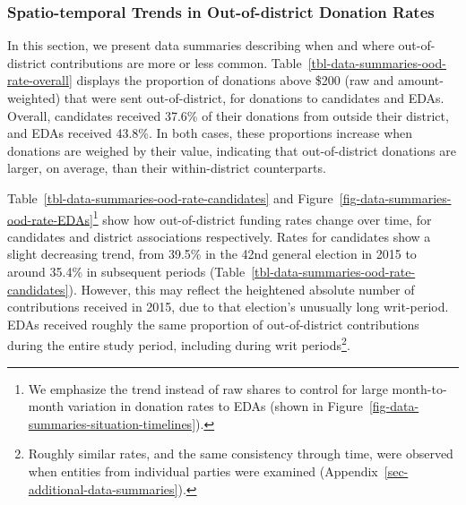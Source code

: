 \documentclass[
  letterpaper,
  DIV=11,
  numbers=noendperiod]{scrartcl}
\begin{document}
\subsubsection{Spatio-temporal Trends in Out-of-district Donation
Rates}\label{sec-data-summaries-ood-rate}

In this section, we present data summaries describing when and where
out-of-district contributions are more or less common.
Table~\ref{tbl-data-summaries-ood-rate-overall} displays the proportion
of donations above \$200 (raw and amount-weighted) that were sent
out-of-district, for donations to candidates and EDAs. Overall,
candidates received 37.6\% of their donations from outside their
district, and EDAs received 43.8\%. In both cases, these proportions
increase when donations are weighed by their value, indicating that
out-of-district donations are larger, on average, than their
within-district counterparts.

Table~\ref{tbl-data-summaries-ood-rate-candidates} and
Figure~\ref{fig-data-summaries-ood-rate-EDAs}\footnote{We emphasize the
  trend instead of raw shares to control for large month-to-month
  variation in donation rates to EDAs (shown in
  Figure~\ref{fig-data-summaries-situation-timelines}).} show how
out-of-district funding rates change over time, for candidates and
district associations respectively. Rates for candidates show a slight
decreasing trend, from 39.5\% in the 42nd general election in 2015 to
around 35.4\% in subsequent periods
(Table~\ref{tbl-data-summaries-ood-rate-candidates}). However, this may
reflect the heightened absolute number of contributions received in
2015, due to that election's unusually long writ-period. EDAs received
roughly the same proportion of out-of-district contributions during the
entire study period, including during writ periods\footnote{Roughly
  similar rates, and the same consistency through time, were observed
  when entities from individual parties were examined
  (Appendix~\ref{sec-additional-data-summaries}).}.
\end{document}

